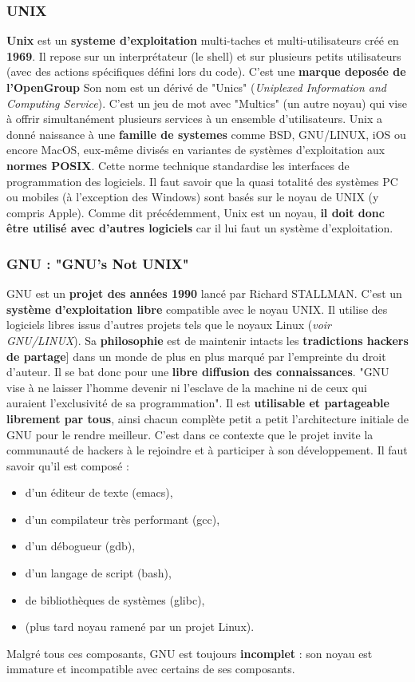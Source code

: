 \subsubsection{UNIX}

\textbf{Unix} est un \textbf{systeme d'exploitation} multi-taches et multi-utilisateurs créé en \textbf{1969}.
 Il repose sur un interprétateur (le shell) et sur plusieurs petits utilisateurs (avec des actions spécifiques défini lors du code).
 C'est une \textbf{marque deposée de l'OpenGroup}
Son nom est un dérivé de "Unics" (\textit{Uniplexed Information and Computing Service}). C'est un jeu de mot avec "Multics"
(un autre noyau) qui vise à offrir simultanément plusieurs services à un ensemble d'utilisateurs.
Unix a donné naissance à une \textbf{famille de systemes} comme BSD, GNU/LINUX, iOS ou encore MacOS, eux-même divisés
en variantes de systèmes d'exploitation aux \textbf{normes POSIX}. Cette norme technique standardise les interfaces de programmation
 des logiciels.
Il faut savoir que la quasi totalité des systèmes PC ou mobiles (à l'exception des Windows) sont basés sur le noyau de UNIX
 (y compris Apple).
Comme dit précédemment, Unix est un noyau, \textbf{il doit donc être utilisé avec d'autres logiciels} car il lui faut un
 système d'exploitation. \newline


\subsubsection{GNU : "GNU's Not UNIX"}

GNU est un \textbf{projet des années 1990} lancé par Richard STALLMAN. C'est un \textbf{système d'exploitation libre} compatible avec
 le noyau UNIX. Il utilise des logiciels libres issus d'autres projets tels que le noyaux Linux (\textit{voir GNU/LINUX}).
Sa \textbf{philosophie} est de maintenir intacts les \textbf{tradictions hackers de partage}] dans un monde de plus en plus marqué par
 l'empreinte du droit d'auteur. Il se bat donc pour une \textbf{libre diffusion des connaissances}. "GNU vise à ne laisser l'homme
 devenir ni l'esclave de la machine ni de ceux qui auraient l'exclusivité de sa programmation".
Il est \textbf{utilisable et partageable librement par tous}, ainsi chacun complète petit a petit l'architecture initiale de GNU pour
 le rendre meilleur. C'est dans ce contexte que le projet invite la communauté de hackers à le rejoindre et à participer à son développement.
Il faut savoir qu'il est composé :
\begin{itemize}
	\item d'un éditeur de texte (emacs),
	\item d'un compilateur très performant (gcc),
	\item d'un débogueur (gdb),
	\item d'un langage de script (bash),
	\item de bibliothèques de systèmes (glibc),
	\item (plus tard noyau ramené par un projet Linux).
\end{itemize}
Malgré tous ces composants, GNU est toujours \textbf{incomplet} : son noyau est immature et incompatible avec certains de ses composants. \newline


